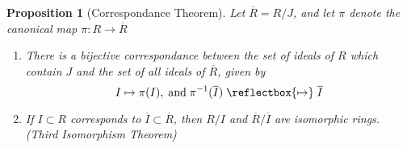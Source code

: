 \documentclass[12pt]{article}
\newtheorem{prop}[thm]{Proposition}
\theoremstyle{definition}
\theoremstyle{remark}
\numberwithin{equation}{section}
\newcommand\mapsfrom{\mathrel{\reflectbox{\ensuremath{\mapsto}}}}
\begin{document}
\begin{prop}[Correspondance Theorem]
        Let $\overline{R} = R/J$, and let $\pi$ denote the canonical map $\pi:R\rightarrow \overline{R}$\begin{enumerate}
                \item There is a bijective correspondance between the set of ideals of $R$ which contain $J$ and the set of all ideals of $\overline{R}$, given by \begin{equation}
                                I\mapsto \pi(I),\;\text{and}\;\pi^{-1}(\overline{I}) \mapsfrom \overline{I}
                \end{equation}
        \item If $I \subset R$ corresponds to $\overline{I} \subset \overline{R}$, then $R/I$ and $\overline{R}/\overline{I}$ are isomorphic rings. (Third Isomorphism Theorem)
        \end{enumerate}
\end{prop}
\end{document}

